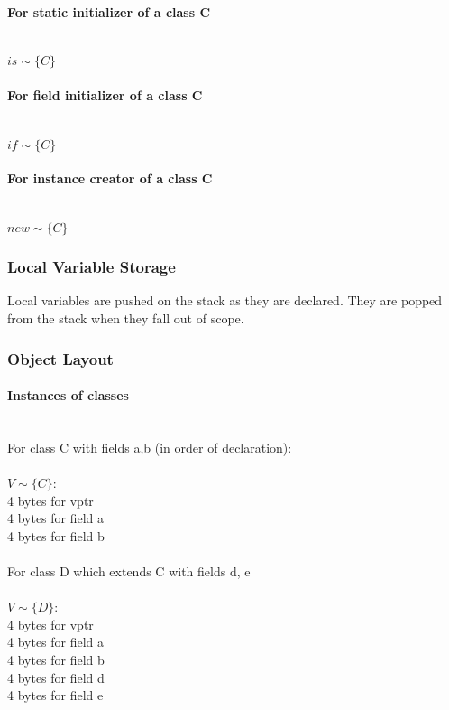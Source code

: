 \documentclass[12pt, a4paper]{article}
\begin{document}
\paragraph{For static initializer of a class C\\}
\noindent \\
$is\sim\{C\}$ \\

\paragraph{For field initializer of a class C\\}
\noindent \\
$if\sim\{C\}$ \\

\paragraph{For instance creator of a class C\\}
\noindent \\
$new\sim\{C\}$ \\

\subsubsection{Local Variable Storage}
Local variables are pushed on the stack as they are declared. They are popped from the stack when they fall out of scope.

\subsubsection{Object Layout}

\paragraph{Instances of classes\\}
\noindent \\
For class C with fields a,b (in order of declaration): \\
\\
$V\sim\{C\}$: \\
4 bytes for vptr \\
4 bytes for field a \\
4 bytes for field b \\
\\
For class D which extends C with fields d, e \\
\\
$V\sim\{D\}$: \\
4 bytes for vptr \\
4 bytes for field a \\
4 bytes for field b \\
4 bytes for field d \\
4 bytes for field e 
\end{document}
